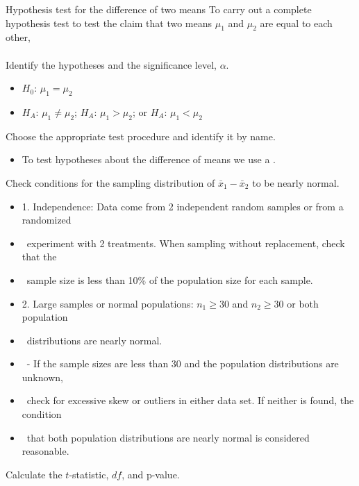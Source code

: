 \begin{onebox}{Hypothesis test for the difference of two means}
To carry out a complete hypothesis test to test the claim that two means $\mu_1$ and $\mu_2$ are equal to each other,
\\
\\
 Identify the hypotheses and the significance level, $\alpha$.
\begin{itemize}\vspace{-1mm}
\setlength{\itemsep}{0mm}
\item[] $H_0$: $\mu_1=\mu_2$  
\item[] $H_A$: $\mu_1\ne \mu_2$; \quad $H_A$: $\mu_1>\mu_2$; \quad or \quad $H_A$: $\mu_1<\mu_2$ 
\end{itemize}
  Choose the appropriate test procedure and identify it by name. \vspace{-1mm}
\begin{itemize}
\item[] To test hypotheses about the difference of means we use a .
\end{itemize}
  Check conditions for the sampling distribution of $\bar{x}_1-\bar{x}_2$ to be nearly normal.\vspace{-1mm}
\begin{itemize}
\setlength{\itemsep}{0mm}
\item[] 1. Independence:  Data come from 2 independent random samples or from a randomized 
\item[] \ \quad experiment with 2 treatments.  When sampling without replacement, check that the  
\item[] \ \quad sample size is less than 10\% of the population size for each sample.
\item[] 2. Large samples or normal populations:  $n_1\ge 30$ and $n_2\ge 30$ or both population 
\item[] \ \quad distributions are nearly normal.
\item[] \quad \ - If the sample sizes are less than 30 and the population distributions are unknown, 
\item[] \quad \ check for excessive skew or outliers in either data set.  If neither is found, the condition 
\item[] \quad \ that both population distributions are nearly normal is considered reasonable.  
\end{itemize}
   Calculate the $t$-statistic, $df$, and p-value.

\end{onebox}

